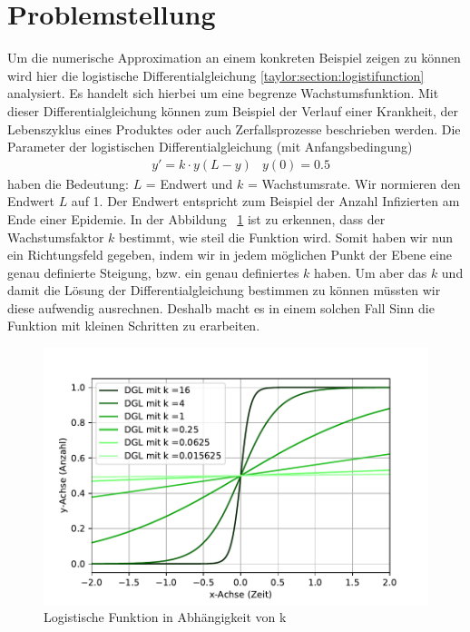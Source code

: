 %
%
%
\section{Problemstellung
\label{taylor:section:problemstellung}}
Um die numerische Approximation an einem konkreten Beispiel zeigen zu können wird hier die logistische Differentialgleichung \eqref{taylor:section:logistifunction} analysiert.
Es handelt sich hierbei um eine begrenze Wachstumsfunktion. 
Mit dieser Differentialgleichung können zum Beispiel der Verlauf einer Krankheit, der Lebenszyklus eines Produktes oder auch Zerfallsprozesse beschrieben werden. Die Parameter der logistischen Differentialgleichung (mit Anfangsbedingung)
\begin{align*}
	&y' = k\cdot y(L-y) 
	&y(0) = 0.5
	\label{taylor:section:logistifunction}
\end{align*}
haben die Bedeutung: $L$ = Endwert und $k$ = Wachstumsrate.
Wir normieren den Endwert $L$ auf 1.
Der Endwert entspricht zum Beispiel der Anzahl Infizierten am Ende einer Epidemie.
In der Abbildung ~\ref{taylor:section:fig:DGLDarstellung} ist zu erkennen, dass der Wachstumsfaktor $k$ bestimmt, wie steil die Funktion wird.
Somit haben wir nun ein Richtungsfeld gegeben, indem wir in jedem möglichen Punkt der Ebene eine genau definierte Steigung, bzw. ein genau definiertes $k$ haben.
Um aber das $k$ und damit die Lösung der Differentialgleichung bestimmen zu können müssten wir diese aufwendig ausrechnen.
Deshalb macht es in einem solchen Fall Sinn die Funktion mit kleinen Schritten zu erarbeiten.

\begin{figure}
	\centering
	\includegraphics[width=12cm]{papers/taylor/taylorPictures/DGLDarstellung.pdf}
	\caption{Logistische Funktion in Abhängigkeit von k}
	\label{taylor:section:fig:DGLDarstellung}
\end{figure}

